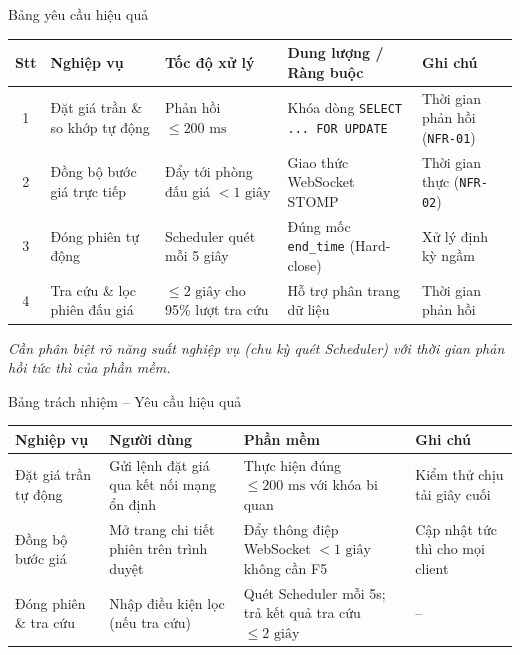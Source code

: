 \documentclass[aspectratio=169, 10pt]{beamer}
\begin{document}
\begin{frame}{Bảng yêu cầu hiệu quả}
    \footnotesize
    \begin{table}[h]
        \centering
        \begin{tabular}{c p{3.2cm} p{3.4cm} p{2.8cm} p{2.5cm}}
            \toprule
            \textbf{Stt} & \textbf{Nghiệp vụ} & \textbf{Tốc độ xử lý} & \textbf{Dung lượng / Ràng buộc} & \textbf{Ghi chú} \\
            \midrule
            1 & Đặt giá trần \& so khớp tự động & Phản hồi $\le 200\text{ ms}$ & Khóa dòng \texttt{SELECT ... FOR UPDATE} & Thời gian phản hồi (\texttt{NFR-01}) \\
            \midrule
            2 & Đồng bộ bước giá trực tiếp & Đẩy tới phòng đấu giá $< 1\text{ giây}$ & Giao thức WebSocket STOMP & Thời gian thực (\texttt{NFR-02}) \\
            \midrule
            3 & Đóng phiên tự động & Scheduler quét mỗi 5 giây & Đúng mốc \texttt{end\_time} (Hard-close) & Xử lý định kỳ ngầm \\
            \midrule
            4 & Tra cứu \& lọc phiên đấu giá & $\le 2\text{ giây}$ cho 95\% lượt tra cứu & Hỗ trợ phân trang dữ liệu & Thời gian phản hồi \\
            \bottomrule
        \end{tabular}
    \end{table}
    \vspace{0.15cm}
    \centering \textit{\footnotesize Cần phân biệt rõ năng suất nghiệp vụ (chu kỳ quét Scheduler) với thời gian phản hồi tức thì của phần mềm.}
\end{frame}

\begin{frame}{Bảng trách nhiệm -- Yêu cầu hiệu quả}
    \footnotesize
    \begin{table}[h]
        \centering
        \begin{tabular}{p{3.0cm} p{3.2cm} p{4.2cm} p{2.5cm}}
            \toprule
            \textbf{Nghiệp vụ} & \textbf{Người dùng} & \textbf{Phần mềm} & \textbf{Ghi chú} \\
            \midrule
            Đặt giá trần tự động & Gửi lệnh đặt giá qua kết nối mạng ổn định & Thực hiện đúng $\le 200\text{ ms}$ với khóa bi quan & Kiểm thử chịu tải giây cuối \\
            \midrule
            Đồng bộ bước giá & Mở trang chi tiết phiên trên trình duyệt & Đẩy thông điệp WebSocket $< 1\text{ giây}$ không cần F5 & Cập nhật tức thì cho mọi client \\
            \midrule
            Đóng phiên \& tra cứu & Nhập điều kiện lọc (nếu tra cứu) & Quét Scheduler mỗi 5s; trả kết quả tra cứu $\le 2\text{ giây}$ & -- \\
            \bottomrule
        \end{tabular}
    \end{table}
\end{frame}
\end{document}
